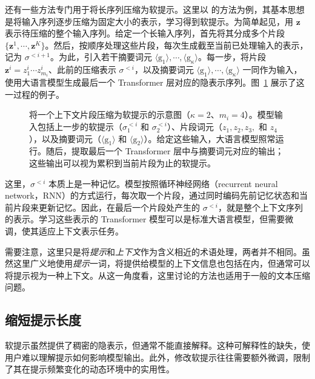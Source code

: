 还有一些方法专门用于将长序列压缩为软提示。这里以 \citet{chevalier-etal:2023adapting} 的方法为例，其基本思想是将输入序列逐步压缩为固定大小的表示，学习得到软提示。为简单起见，用 $\mathbf z$ 表示待压缩的整个输入序列。给定一个长输入序列，首先将其分成多个片段 $\{\mathbf{z}^1, \cdots, \mathbf{z}^K\}$。然后，按顺序处理这些片段，每次生成截至当前已处理输入的表示，记为 $\sigma^{<i+1}$。为此，引入若干摘要词元 ${\langle \mathrm{g}_1 \rangle, \cdots, \langle \mathrm{g}_{\kappa} \rangle}$。每一步，将片段 $\mathbf{z}^i = z_1^{i} \cdots z_{m_i}^{i}$、此前的压缩表示 $\sigma^{<i}$，以及摘要词元 $\langle \mathrm{g}_1 \rangle, \cdots, \langle \mathrm{g}_{\kappa} \rangle$ 一同作为输入，使用大语言模型生成最后一个 Transformer 层对应的隐表示序列。图~\ref{fig:compressing-context-with-summary-tokens} 展示了这一过程的例子。

\begin{figure}[!t]
\centering

\caption{将一个上下文片段压缩为软提示的示意图（$\kappa = 2$、$m_i = 4$）。模型输入包括上一步的软提示（$\sigma^{<i}_1$ 和 $\sigma^{<i}_2$）、片段词元（$z_1, z_2, z_3,$ 和 $z_4$），以及摘要词元（$\langle \mathrm{g}_1 \rangle$ 和 $\langle \mathrm{g}_2 \rangle$）。给定这些输入，大语言模型照常运行。随后，提取最后一个 Transformer 层中与摘要词元对应的输出；这些输出可以视为累积到当前片段为止的软提示。}
\label{fig:compressing-context-with-summary-tokens}
\end{figure}

这里，$\sigma^{<i}$ 本质上是一种记忆。模型按照循环神经网络（recurrent neural network，RNN）的方式运行，每次取一个片段，通过同时编码先前记忆状态和当前片段来更新记忆。因此，在最后一个片段处产生的 $\sigma^{<i}$，就是整个上下文序列的表示。学习这些表示的 Transformer 模型可以是标准大语言模型，但需要微调，使其适应上下文表示任务。

需要注意，这里只是将\textit{提示}和\textit{上下文}作为含义相近的术语处理，两者并不相同。虽然这里广义地使用\textit{提示}一词，将提供给模型的上下文信息也包括在内，但通常可以将提示视为一种上下文。从这一角度看，这里讨论的方法也适用于一般的文本压缩问题。

\subsection{缩短提示长度}

软提示虽然提供了稠密的隐表示，但通常不能直接解释。这种可解释性的缺失，使用户难以理解提示如何影响模型输出。此外，修改软提示往往需要额外微调，限制了其在提示频繁变化的动态环境中的实用性。

